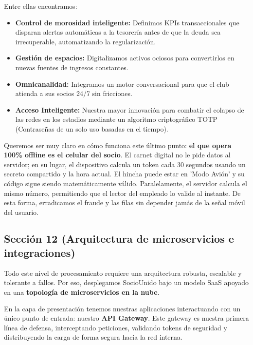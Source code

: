 Entre ellas encontramos:

\begin{itemize}
    \item \textbf{Control de morosidad inteligente:} Definimos KPIs transaccionales que disparan alertas automáticas a la tesorería antes de que la deuda sea irrecuperable, automatizando la regularización.
    \item \textbf{Gestión de espacios:} Digitalizamos activos ociosos para convertirlos en nuevas fuentes de ingresos constantes.
    \item \textbf{Omnicanalidad:} Integramos un motor conversacional para que el club atienda a sus socios 24/7 sin fricciones.
    \item \textbf{Acceso Inteligente:} Nuestra mayor innovación para combatir el colapso de las redes en los estadios mediante un algoritmo criptográfico TOTP (Contraseñas de un solo uso basadas en el tiempo).
\end{itemize}

Queremos ser muy claro en cómo funciona este último punto: \textbf{el que opera 100\% offline es el celular del socio}. El carnet digital no le pide datos al servidor; en su lugar, el dispositivo calcula un token cada 30 segundos usando un secreto compartido y la hora actual. El hincha puede estar en 'Modo Avión' y su código sigue siendo matemáticamente válido. Paralelamente, el servidor calcula el mismo número, permitiendo que el lector del empleado lo valide al instante. De esta forma, erradicamos el fraude y las filas sin depender jamás de la señal móvil del usuario.

\subsection{Sección 12 (Arquitectura de microservicios e integraciones)}

Todo este nivel de procesamiento requiere una arquitectura robusta, escalable y tolerante a fallos. Por eso, desplegamos SocioUnido bajo un modelo SaaS apoyado en una \textbf{topología de microservicios en la nube}.

En la capa de presentación tenemos nuestras aplicaciones interactuando con un único punto de entrada: nuestro \textbf{API Gateway}. Este gateway es nuestra primera línea de defensa, interceptando peticiones, validando tokens de seguridad y distribuyendo la carga de forma segura hacia la red interna.

